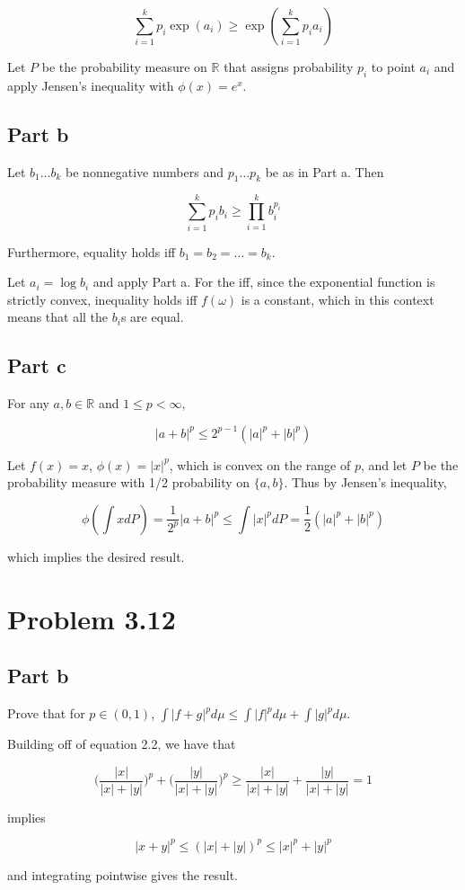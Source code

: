 \documentclass{article}
\newcommand{\R}{\mathbb{R}}
\begin{document}
\[
\sum_{i=1}^kp_i\exp(a_i) \geq \exp\left( \sum_{i=1}^kp_ia_i \right)
\]

Let $P$ be the probability measure on $\R$ that assigns probability $p_i$ to point $a_i$ and apply Jensen's inequality with $\phi(x) = e^x$.

\subsection*{Part b}

Let $b_1 \dots b_k$ be nonnegative numbers and $p_1 \dots p_k$ be as in Part a. Then

\[
\sum_{i=1}^k p_ib_i \geq \prod_{i=1}^k b_i^{p_i}
\]

Furthermore, equality holds iff $b_1 = b_2 = \dots = b_k$.

Let $a_i = \log b_i$ and apply Part a. For the iff, since the exponential function is strictly convex, inequality holds iff $f(\omega)$ is a constant, which in this context means that all the $b_i$s are equal.

\subsection*{Part c}

For any $a, b \in \R$ and $1 \leq p < \infty$,

\[
|a+b|^p \leq 2^{p-1}(|a|^p + |b|^p)
\]

Let $f(x) = x$, $\phi(x) = |x|^p$, which is convex on the range of $p$, and let $P$ be the probability measure with 1/2 probability on $\{a, b\}$. Thus by Jensen's inequality,

\[
\phi\left( \int xdP \right) = \frac{1}{2^p}|a+b|^p \leq \int |x|^pdP = \frac{1}{2}(|a|^p + |b|^p)
\]

which implies the desired result.

\section*{Problem 3.12}

\subsection*{Part b}

Prove that for $p \in (0, 1)$, $\int |f+g|^pd\mu \leq \int|f|^pd\mu + \int|g|^pd\mu$.

Building off of equation 2.2, we have that

\[
\biggl( \frac{|x|}{|x|+|y|} \biggr)^p + \biggl( \frac{|y|}{|x|+|y|} \biggr)^p \geq \frac{|x|}{|x|+|y|} + \frac{|y|}{|x|+|y|} = 1
\]

implies

\[
|x+y|^p \leq (|x|+|y|)^p \leq |x|^p + |y|^p
\]

and integrating pointwise gives the result.
\end{document}
